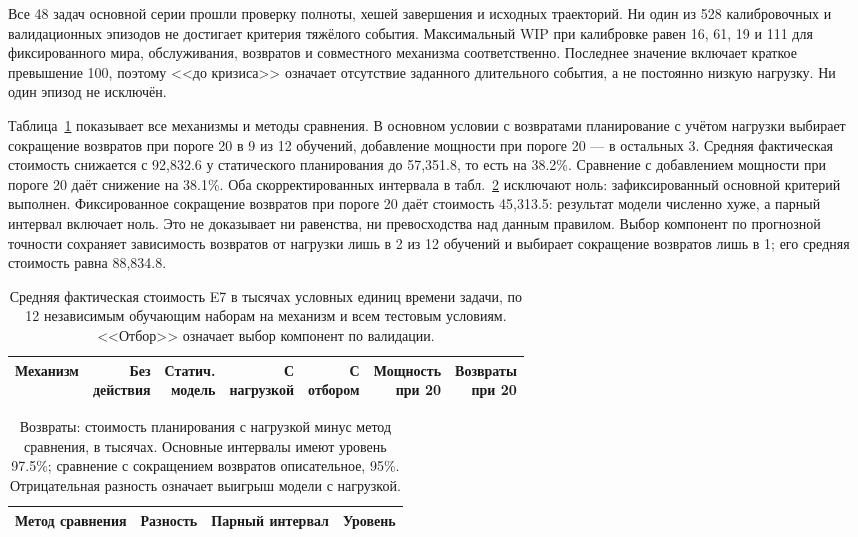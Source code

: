 Все 48 задач основной серии прошли проверку полноты, хешей завершения и исходных траекторий. Ни один из 528 калибровочных и валидационных эпизодов не достигает критерия тяжёлого события. Максимальный WIP при калибровке равен 16, 61, 19 и 111 для фиксированного мира, обслуживания, возвратов и совместного механизма соответственно. Последнее значение включает краткое превышение 100, поэтому <<до кризиса>> означает отсутствие заданного длительного события, а не постоянно низкую нагрузку. Ни один эпизод не исключён.

Таблица~\ref{tab:e7cost} показывает все механизмы и методы сравнения. В основном условии с возвратами планирование с учётом нагрузки выбирает сокращение возвратов при пороге 20 в 9 из 12 обучений, добавление мощности при пороге 20 --- в остальных 3. Средняя фактическая стоимость снижается с 92,832.6 у статического планирования до 57,351.8, то есть на 38.2\%. Сравнение с добавлением мощности при пороге 20 даёт снижение на 38.1\%. Оба скорректированных интервала в табл.~\ref{tab:e7contrast} исключают ноль: зафиксированный основной критерий выполнен. Фиксированное сокращение возвратов при пороге 20 даёт стоимость 45,313.5: результат модели численно хуже, а парный интервал включает ноль. Это не доказывает ни равенства, ни превосходства над данным правилом. Выбор компонент по прогнозной точности сохраняет зависимость возвратов от нагрузки лишь в 2 из 12 обучений и выбирает сокращение возвратов лишь в 1; его средняя стоимость равна 88,834.8.

\begin{table}[t]
\caption{Средняя фактическая стоимость E7 в тысячах условных единиц времени задачи, по 12 независимым обучающим наборам на механизм и всем тестовым условиям. <<Отбор>> означает выбор компонент по валидации.}\label{tab:e7cost}
\centering\small\setlength{\tabcolsep}{3pt}
\begin{tabular}{lrrrrrr}\toprule
Механизм & \shortstack{Без\\действия} & \shortstack{Статич.\\модель} & \shortstack{С\\нагрузкой} & \shortstack{С\\отбором} & \shortstack{Мощность\\при 20} & \shortstack{Возвраты\\при 20}\\\midrule

\end{tabular}
\end{table}
\begin{table}[t]
\caption{Возвраты: стоимость планирования с нагрузкой минус метод сравнения, в тысячах. Основные интервалы имеют уровень 97.5\%; сравнение с сокращением возвратов описательное, 95\%. Отрицательная разность означает выигрыш модели с нагрузкой.}\label{tab:e7contrast}
\centering\small
\begin{tabular}{lrrr}\toprule
Метод сравнения & Разность & Парный интервал & Уровень\\\midrule

\end{tabular}
\end{table}


